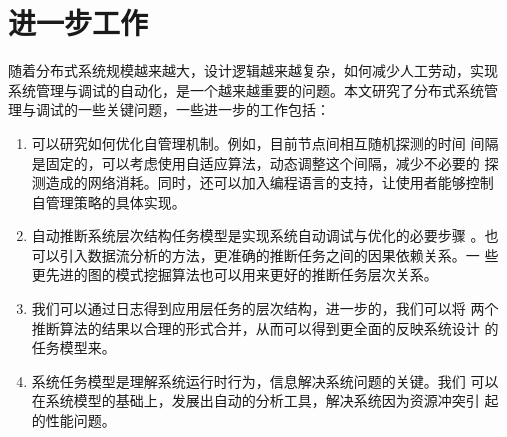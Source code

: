 \section{进一步工作}

随着分布式系统规模越来越大，设计逻辑越来越复杂，如何减少人工劳动，实现
系统管理与调试的自动化，是一个越来越重要的问题。本文研究了分布式系统管
理与调试的一些关键问题，一些进一步的工作包括：

\begin{enumerate}

  \item 可以研究如何优化自管理机制。例如，目前节点间相互随机探测的时间
  间隔是固定的，可以考虑使用自适应算法，动态调整这个间隔，减少不必要的
  探测造成的网络消耗。同时，还可以加入编程语言的支持，让使用者能够控制
  自管理策略的具体实现。

  \item 自动推断系统层次结构任务模型是实现系统自动调试与优化的必要步骤
  。也可以引入数据流分析的方法，更准确的推断任务之间的因果依赖关系。一
  些更先进的图的模式挖掘算法也可以用来更好的推断任务层次关系。
  
  \item 我们可以通过日志得到应用层任务的层次结构，进一步的，我们可以将
  两个推断算法的结果以合理的形式合并，从而可以得到更全面的反映系统设计
  的任务模型来。

  \item 系统任务模型是理解系统运行时行为，信息解决系统问题的关键。我们
  可以在系统模型的基础上，发展出自动的分析工具，解决系统因为资源冲突引
  起的性能问题。
  
\end{enumerate}
